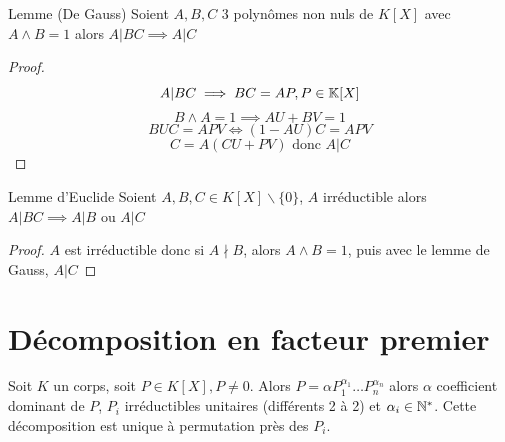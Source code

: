 \documentclass[]{report}
\begin{document}
    \begin{lm}{Lemme (De Gauss)}{}
        Soient $A,B,C$ 3 polynômes non nuls de $K[X]$ avec $A\wedge B=1$ alors $ A|BC \implies A|C$
    \end{lm}

    \begin{proof}
        \[A|BC\implies BC=AP,P\in \mathbb{K}[X]\]
        \[B\wedge A=1\implies AU+BV=1\]
        \[BU C=APV\iff (1-AU)C=APV\]
        \[C=A(CU+PV)\text{ donc }A|C\]
    \end{proof}

    \begin{lm}{Lemme d'Euclide}{}
        Soient $A,B,C\in K[X]\backslash\{0\}$, $A$ irréductible alors $A|BC \implies A|B$ ou $A|C$
    \end{lm}

    \begin{proof}
        $A$ est irréductible donc si $A\nmid B$, alors $A\wedge B=1$, puis avec le lemme de Gauss, $A|C$
    \end{proof}

    \section{Décomposition en facteur premier}

    \begin{tm}{}{}
        Soit $K$ un corps, soit $P\in K[X],P\neq 0$. Alors $P=\alpha P_1^{\alpha_1}\dots P_n^{\alpha_n}$ alors $\alpha$ coefficient dominant de $P$, $P_i$ irréductibles unitaires (différents 2 à 2) et $\alpha_i\in\mathbb{N}^*$. Cette décomposition est unique à permutation près des $P_i$.
    \end{tm}
\end{document}
